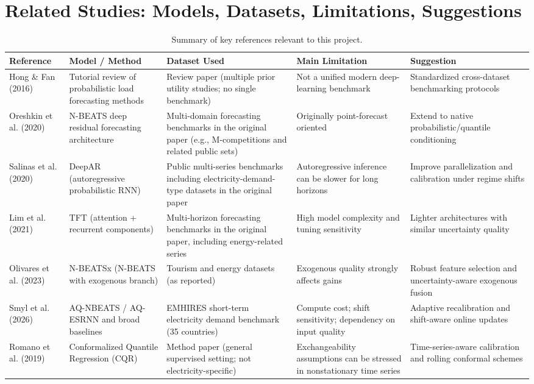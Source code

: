 \section{Related Studies: Models, Datasets, Limitations, Suggestions}
\label{sec:related}
\begin{table}[H]
\centering
\caption{Summary of key references relevant to this project.}
\label{tab:lit_summary}
\begin{tabular}{p{2cm} p{3.1cm} p{3.6cm} p{3.1cm} p{3.1cm}}
\toprule
\textbf{Reference} & \textbf{Model / Method} & \textbf{Dataset Used} & \textbf{Main Limitation} & \textbf{Suggestion} \\
\midrule
Hong \& Fan (2016)~\cite{hong2016probabilistic} & Tutorial review of probabilistic load forecasting methods & Review paper (multiple prior utility studies; no single benchmark) & Not a unified modern deep-learning benchmark & Standardized cross-dataset benchmarking protocols \\
\midrule
Oreshkin et al. (2020)~\cite{oreshkin2020nbeats} & N-BEATS deep residual forecasting architecture & Multi-domain forecasting benchmarks in the original paper (e.g., M-competitions and related public sets) & Originally point-forecast oriented & Extend to native probabilistic/quantile conditioning \\
\midrule
Salinas et al. (2020)~\cite{salinas2020deepar} & DeepAR (autoregressive probabilistic RNN) & Public multi-series benchmarks including electricity-demand-type datasets in the original paper & Autoregressive inference can be slower for long horizons & Improve parallelization and calibration under regime shifts \\
\midrule
Lim et al. (2021)~\cite{lim2021tft} & TFT (attention + recurrent components) & Multi-horizon forecasting benchmarks in the original paper, including energy-related series & High model complexity and tuning sensitivity & Lighter architectures with similar uncertainty quality \\
\midrule
Olivares et al. (2023)~\cite{olivares2023nbeatsx} & N-BEATSx (N-BEATS with exogenous branch) & Tourism and energy datasets (as reported) & Exogenous quality strongly affects gains & Robust feature selection and uncertainty-aware exogenous fusion \\
\midrule
Smyl et al. (2026)~\cite{smyl2025anyquantile} & AQ-NBEATS / AQ-ESRNN and broad baselines & EMHIRES short-term electricity demand benchmark (35 countries) & Compute cost; shift sensitivity; dependency on input quality & Adaptive recalibration and shift-aware online updates \\
\midrule
Romano et al. (2019)~\cite{romano2019cqr} & Conformalized Quantile Regression (CQR) & Method paper (general supervised setting; not electricity-specific) & Exchangeability assumptions can be stressed in nonstationary time series & Time-series-aware calibration and rolling conformal schemes \\
\bottomrule
\end{tabular}
\end{table}
